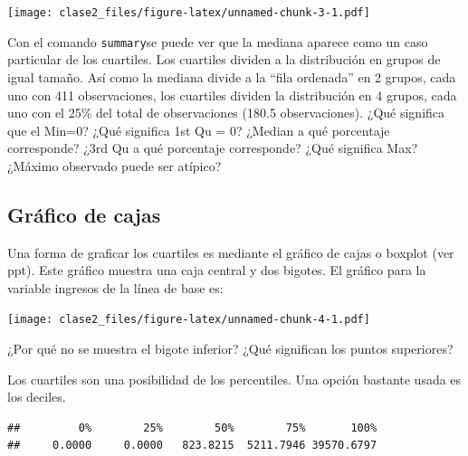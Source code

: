 \documentclass[
]{article}
\newenvironment{Shaded}{\begin{snugshade}}{\end{snugshade}}
\newcommand{\DecValTok}[1]{\textcolor[rgb]{0.00,0.00,0.81}{#1}}
\newcommand{\FunctionTok}[1]{\textcolor[rgb]{0.00,0.00,0.00}{#1}}
\newcommand{\NormalTok}[1]{#1}
\newcommand{\SpecialCharTok}[1]{\textcolor[rgb]{0.00,0.00,0.00}{#1}}
\begin{document}
\texttt{[image: clase2\_files/figure-latex/unnamed-chunk-3-1.pdf]}

Con el comando \texttt{summary}se puede ver que la mediana aparece como
un caso particular de los cuartiles. Los cuartiles dividen a la
distribución en grupos de igual tamaño. Así como la mediana divide a la
``fila ordenada'' en 2 grupos, cada uno con 411 observaciones, los
cuartiles dividen la distribución en 4 grupos, cada uno con el 25\% del
total de observaciones (180.5 observaciones). ¿Qué significa que el
Min=0? ¿Qué significa 1st Qu = 0? ¿Median a qué porcentaje corresponde?
¿3rd Qu a qué porcentaje corresponde? ¿Qué significa Max? ¿Máximo
observado puede ser atípico?

\hypertarget{gruxe1fico-de-cajas}{%
\subsection{Gráfico de cajas}\label{gruxe1fico-de-cajas}}

Una forma de graficar los cuartiles es mediante el gráfico de cajas o
boxplot (ver ppt). Este gráfico muestra una caja central y dos bigotes.
El gráfico para la variable ingresos de la línea de base es:

\begin{Shaded}
\end{Shaded}

\texttt{[image: clase2\_files/figure-latex/unnamed-chunk-4-1.pdf]}

¿Por qué no se muestra el bigote inferior? ¿Qué significan los puntos
superiores?

Los cuartiles son una posibilidad de los percentiles. Una opción
bastante usada es los deciles.

\begin{Shaded}
\end{Shaded}

\begin{verbatim}
##         0%        25%        50%        75%       100% 
##     0.0000     0.0000   823.8215  5211.7946 39570.6797
\end{verbatim}

\begin{Shaded}
\end{Shaded}
\end{document}
